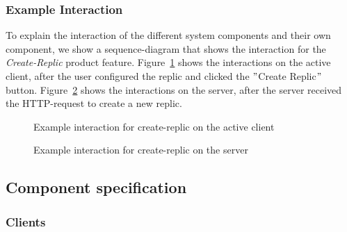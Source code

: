 \subsubsection{Example Interaction}
To explain the interaction of the different system components and their own component, we show a sequence-diagram that shows the interaction for the \textit{Create-Replic} product feature. \newline
Figure~\ref{fig:sequence-create-replic-client} shows the interactions on the active client, after the user configured the replic and clicked the \("\)Create Replic\("\) button. \newline
Figure~\ref{fig:sequence-create-replic-server} shows the interactions on the server, after the server received the HTTP-request to create a new replic.

\begin{figure}
    \centering
    \caption{Example interaction for create-replic on the active client}
    \label{fig:sequence-create-replic-client}
\end{figure}

\begin{figure}
    \centering
    \caption{Example interaction for create-replic on the server}
    \label{fig:sequence-create-replic-server}
\end{figure}

\subsection{Component specification}\label{subsec:component-specification}

\subsubsection{Clients}

